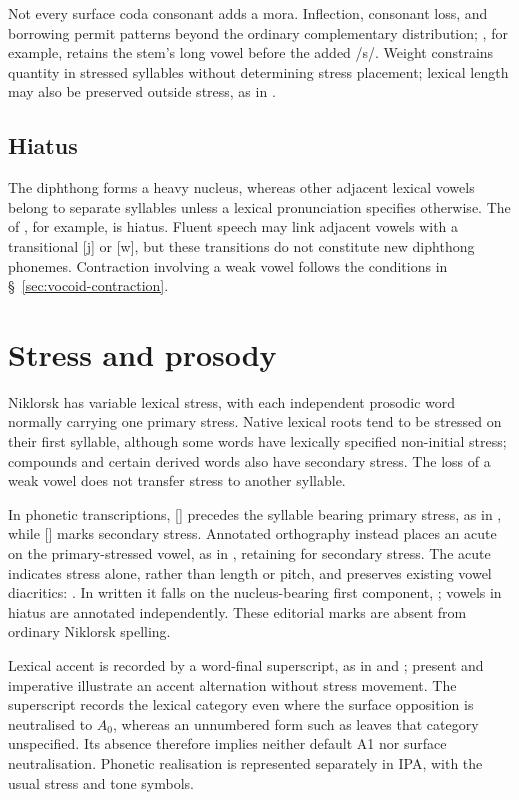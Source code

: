Not every surface coda consonant adds a mora. Inflection, consonant loss, and borrowing permit patterns beyond the ordinary complementary distribution; , for example, retains the stem's long vowel before the added /s/. Weight constrains quantity in stressed syllables without determining stress placement; lexical length may also be preserved outside stress, as in .

\subsection{Hiatus}

The diphthong  forms a heavy nucleus, whereas other adjacent lexical vowels belong to separate syllables unless a lexical pronunciation specifies otherwise. The  of , for example, is hiatus. Fluent speech may link adjacent vowels with a transitional [j] or [w], but these transitions do not constitute new diphthong phonemes. Contraction involving a weak vowel follows the conditions in \S~\ref{sec:vocoid-contraction}.

\section{Stress and prosody}
\label{sec:stress-prosody}

Niklorsk has variable lexical stress, with each independent prosodic word normally carrying one primary stress. Native lexical roots tend to be stressed on their first syllable, although some words have lexically specified non-initial stress; compounds and certain derived words also have secondary stress. The loss of a weak vowel does not transfer stress to another syllable.

In phonetic transcriptions, [] precedes the syllable bearing primary stress, as in , while [] marks secondary stress. Annotated orthography instead places an acute on the primary-stressed vowel, as in , retaining  for secondary stress. The acute indicates stress alone, rather than length or pitch, and preserves existing vowel diacritics: . In written  it falls on the nucleus-bearing first component, ; vowels in hiatus are annotated independently. These editorial marks are absent from ordinary Niklorsk spelling.

Lexical accent is recorded by a word-final superscript, as in  and ; present  and imperative  illustrate an accent alternation without stress movement. The superscript records the lexical category even where the surface opposition is neutralised to $A_0$, whereas an unnumbered form such as  leaves that category unspecified. Its absence therefore implies neither default A1 nor surface neutralisation. Phonetic realisation is represented separately in IPA, with the usual stress and tone symbols.

